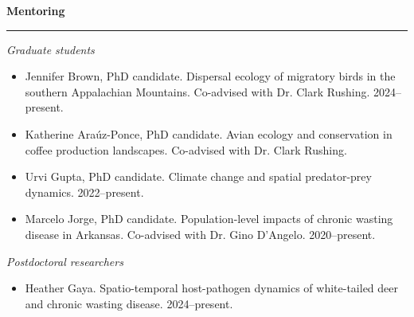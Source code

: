 \documentclass[12pt]{article}
\begin{document}



\vspace{0.5cm}

{\large \bf Mentoring} \\
\rule[3mm]{\textwidth}{0.3mm}

{\it Graduate students}
\begin{itemize}
  \item Jennifer Brown, PhD candidate. Dispersal ecology of migratory
    birds in the southern Appalachian Mountains. Co-advised with
    Dr. Clark Rushing. 2024--present.
  \item Katherine Ara\'uz-Ponce, PhD candidate. Avian ecology and
    conservation in coffee production landscapes. Co-advised with
    Dr. Clark Rushing.
  \item Urvi Gupta, PhD candidate. Climate change and spatial
    predator-prey dynamics. 2022--present. 
  \item Marcelo Jorge, PhD candidate. Population-level impacts of
    chronic wasting disease in Arkansas. Co-advised with Dr. Gino
    D'Angelo. 2020--present.
\end{itemize}

{\it Postdoctoral researchers}
\begin{itemize}
   \item Heather Gaya. Spatio-temporal host-pathogen dynamics of
     white-tailed deer and chronic wasting disease. 2024--present. 
\end{itemize}

\end{document}
